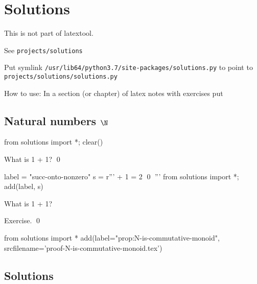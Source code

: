 \section{Solutions}

This is not part of latextool.

See \verb!projects/solutions!

Put symlink \verb!/usr/lib64/python3.7/site-packages/solutions.py!
to point to 
\verb!projects/solutions/solutions.py!

How to use: In a section (or chapter) of latex notes with exercises put
\begin{console}
\section{Natural numbers $\N$}
\begin{python0}
from solutions import *; clear()
\end{python0}

\begin{ex}
  \label{ex:succ-onto-nonzero}
  What is 1 + 1?
  \qed
\end{ex}
\begin{python0}
label = "succ-onto-nonzero"
s = r'''
 + 1 = 2
\qed
'''
from solutions import *; add(label, s)
\end{python0}

\begin{prop}
  \label{prop:N-is-commutative-monoid}
  What is 1 + 1?
\end{prop}

\proof
Exercise.
\qed
\begin{python0}
from solutions import *
add(label="prop:N-is-commutative-monoid",
    srcfilename='proof-N-is-commutative-monoid.tex')
\end{python0}

\newpage
\subsection{Solutions}



\end{console}
